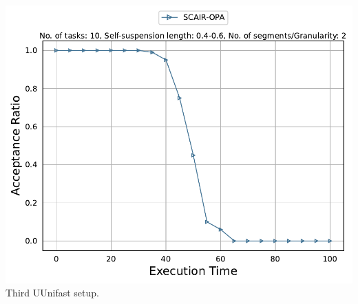 \documentclass[]{article}
\begin{document}
\begin{minipage}[t]{0.48\linewidth}
            \includegraphics[width=\linewidth]{SCAIR-OPA[2][0.4-0.6][10].pdf}
		Third UUnifast setup.
		\vspace{0.3cm}
		

		
	\end{minipage}\hfill
\end{document}
